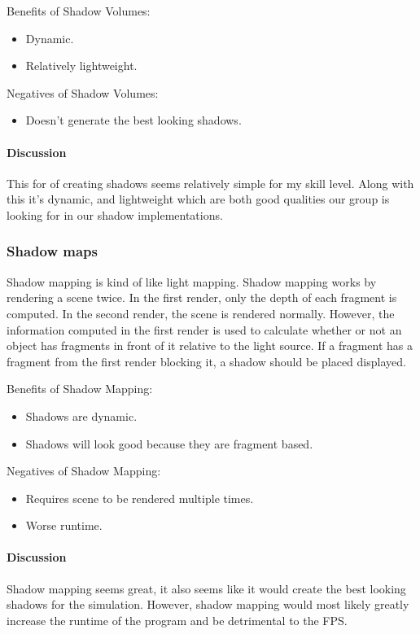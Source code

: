 \documentclass[10pt,journal,compsoc,draftclsnofoot]{IEEEtran}
\begin{document}
Benefits of Shadow Volumes:
\begin{itemize}
\item Dynamic.
\item Relatively lightweight.
\end{itemize}

Negatives of Shadow Volumes:
\begin{itemize}
\item Doesn't generate the best looking shadows.
\end{itemize}

\paragraph{Discussion}
\vspace{3mm}
This for of creating shadows seems relatively simple for my skill level.
Along with this it's dynamic, and lightweight which are both good qualities our group is looking for in our shadow implementations.

\subsubsection{Shadow maps}
Shadow mapping is kind of like light mapping.
Shadow mapping works by rendering a scene twice.
In the first render, only the depth of each fragment is computed.
In the second render, the scene is rendered normally.
However, the information computed in the first render is used to calculate whether or not an object has fragments in front of it relative to the light source.
If a fragment has a fragment from the first render blocking it, a shadow should be placed displayed. \cite{shadowMapping}

Benefits of Shadow Mapping:
\begin{itemize}
\item Shadows are dynamic.
\item Shadows will look good because they are fragment based.
\end{itemize}

Negatives of Shadow Mapping:
\begin{itemize}
\item Requires scene to be rendered multiple times.
\item Worse runtime.
\end{itemize}

\paragraph{Discussion}
\vspace{3mm}
Shadow mapping seems great, it also seems like it would create the best looking shadows for the simulation.
However, shadow mapping would most likely greatly increase the runtime of the program and be detrimental to the FPS.
\end{document}
